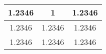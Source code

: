 \begin{table}
    \centering
    \begin{tabular}{ccc}
        \toprule
        1.2346 & 1 & 1.2346 \\
        \midrule
        1.2346 & 1.2346 & 1.2346 \\
        1.2346 & 1.2346 & 1.2346 \\
        \bottomrule
    \end{tabular}
\end{table}
